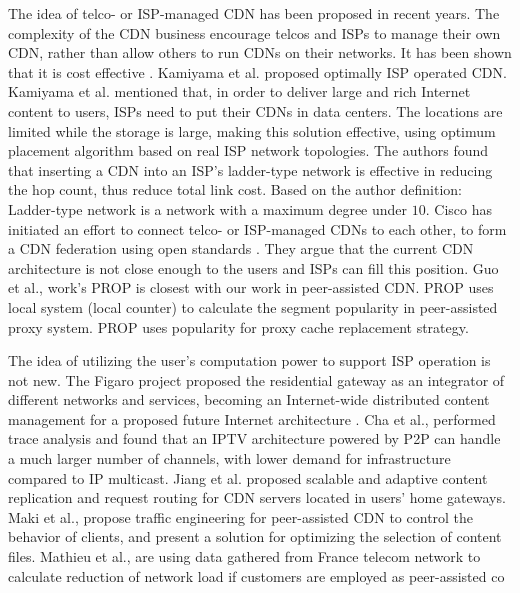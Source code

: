 The idea of telco- or ISP-managed CDN has been proposed in recent years.  
The complexity of the CDN business encourage telcos and ISPs to manage their own CDN, rather than allow others to run CDNs on their networks.  
It has been shown that it is cost effective \cite{federation}\cite{norton2011internet}. 
Kamiyama et al. \cite{NoriakiKAMIYAMA2013} proposed optimally ISP operated CDN.
Kamiyama et al. mentioned that, in order to deliver large and rich Internet content to users, ISPs need to put their CDNs in data centers.  
The locations are limited while the storage is large, making this solution effective, using optimum placement algorithm based on real ISP network topologies.  
The authors found that inserting a CDN into an ISP's ladder-type network is effective in reducing the hop count, thus reduce total link cost.  
Based on the author definition: Ladder-type network is a network with a maximum degree under $10$.
Cisco has initiated an effort to connect telco- or ISP-managed CDNs to each other, to form a CDN federation \cite{federation} using open standards \cite{cdni}.  
They argue that the current CDN architecture is not close enough to the users and ISPs can fill this position.
Guo et al., \cite{1613869} work's PROP is closest with our work in peer-assisted CDN.
PROP uses local system (local counter) to calculate the segment popularity in peer-assisted proxy system. 
PROP uses popularity for proxy cache replacement strategy. 


The idea of utilizing the user's computation power to support ISP operation is not new.  
The Figaro project \cite{figaro} proposed the residential gateway as an integrator of different networks and services, becoming an Internet-wide distributed content management for a proposed future Internet architecture \cite{figaro}.  
Cha et al.,\cite{Cha:2008:NTP:1855641.1855646} performed trace analysis and found that an IPTV architecture powered by P2P can handle a much larger number of channels, with lower demand for infrastructure compared to IP multicast.  
Jiang et al. \cite{Jiang:2012:OMD:2413176.2413193} proposed scalable and adaptive content replication and request routing for CDN servers located in users' home gateways.  
Maki et al.,\cite{NaoyaMAKI2012} propose traffic engineering for peer-assisted CDN to control the behavior of clients, and present a solution for optimizing the selection of content files.
Mathieu et al., \cite{6249305} are using data gathered from France telecom network to calculate reduction of network load if customers are employed as peer-assisted co


